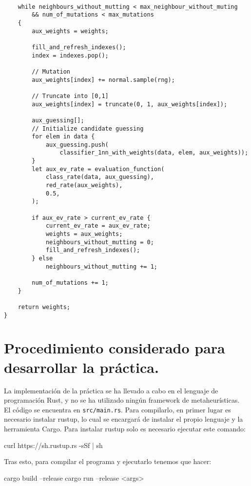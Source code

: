 \documentclass[size=a4, parskip=half, titlepage=false, toc=flat, toc=bib, 12pt]{scrartcl}
\begin{document}
\begin{verbatim}

    while neighbours_without_mutting < max_neighbour_without_muting
        && num_of_mutations < max_mutations
    {
        aux_weights = weights;

        fill_and_refresh_indexes();
        index = indexes.pop();

        // Mutation
        aux_weights[index] += normal.sample(rng);

        // Truncate into [0,1]
        aux_weights[index] = truncate(0, 1, aux_weights[index]);

        aux_guessing[];
        // Initialize candidate guessing
        for elem in data {
            aux_guessing.push(
                classifier_1nn_with_weights(data, elem, aux_weights));
        }
        let aux_ev_rate = evaluation_function(
            class_rate(data, aux_guessing),
            red_rate(aux_weights),
            0.5,
        );

        if aux_ev_rate > current_ev_rate {
            current_ev_rate = aux_ev_rate;
            weights = aux_weights;
            neighbours_without_mutting = 0;
            fill_and_refresh_indexes();
        } else
            neighbours_without_mutting += 1;

        num_of_mutations += 1;
    }

    return weights;
}

\end{verbatim}

\newpage
\section{Procedimiento considerado para desarrollar la práctica.}
La implementación de la práctica se ha llevado a cabo en el lenguaje de programación Rust, y no se ha utilizado ningún framework de metaheurísticas.\\

El código se encuentra en \texttt{src/main.rs}. Para compilarlo, en primer lugar es necesario instalar rustup, lo cual se encargará de instalar el propio lenguaje y la herramienta Cargo. Para instalar rustup solo es necesario ejecutar este comando:
\begin{shell}
curl https://sh.rustup.rs -sSf | sh
\end{shell}

Tras esto, para compilar el programa y ejecutarlo tenemos que hacer:
\begin{shell}
cargo build --release
cargo run --release <args>
\end{shell}
\end{document}
